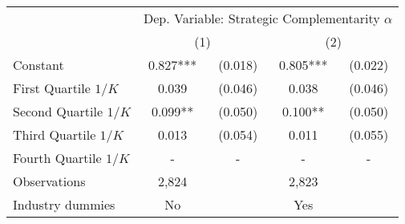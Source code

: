 \begin{tabular*}{0.85\hsize}{@{\hskip\tabcolsep\extracolsep\fill}l*{4}{c}} \toprule
& \multicolumn{4}{c}{Dep. Variable: Strategic Complementarity $ \alpha $ } \\ \cline{2-5}
& \multicolumn{2}{c}{(1)} & \multicolumn{2}{c}{(2)}\\ \midrule
Constant               & 0.827*** & (0.018) & 0.805*** & (0.022)            \\
First Quartile $1/K$   & 0.039 & (0.046) & 0.038 & (0.046)           \\
Second Quartile $1/K$  & 0.099** & (0.050) & 0.100** & (0.050)           \\
Third Quartile $1/K$   & 0.013 & (0.054) & 0.011 & (0.055)           \\
Fourth Quartile $1/K$ & - & - & - & -     \\ \midrule
Observations    &       2,824 &    &       2,823 &               \\
Industry dummies      & No & & Yes \\ \bottomrule
\end{tabular*}
